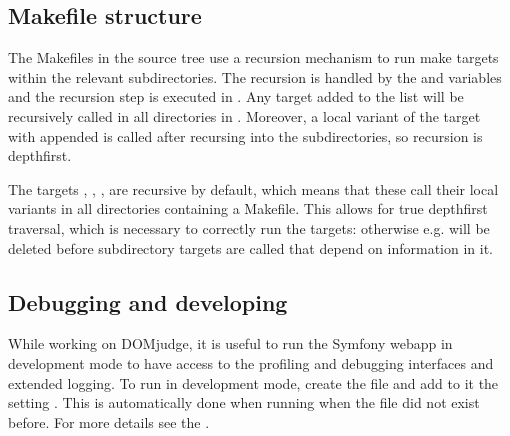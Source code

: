 \documentclass[a4paper,10pt,english,openany]{sphinxmanual}
\begin{document}
\subsection{Makefile structure}
\label{\detokenize{develop:makefile-structure}}
\sphinxAtStartPar
The Makefiles in the source tree use a recursion mechanism to run make
targets within the relevant subdirectories. The recursion is handled
by the  and  variables and the
recursion step is executed in . Any target
added to the  list will be recursively called in
all directories in . Moreover, a local variant of the
target with  appended is called after recursing into the
subdirectories, so recursion is depth\sphinxhyphen{}first.

\sphinxAtStartPar
The targets , , , 
are recursive by default, which means that these call their local
 variants in all directories containing a Makefile. This
allows for true depth\sphinxhyphen{}first traversal, which is necessary to correctly
run the  targets: otherwise e.g.  will
be deleted before subdirectory  targets are called that
depend on information in it.


\subsection{Debugging and developing}
\label{\detokenize{develop:debugging-and-developing}}
\sphinxAtStartPar
While working on DOMjudge, it is useful to run the Symfony webapp in
development mode to have access to the profiling and debugging
interfaces and extended logging. To run in development mode, create
the file  and add to it the setting
. This is automatically done when running  when the file did not exist before.
For more details see the .
\end{document}

